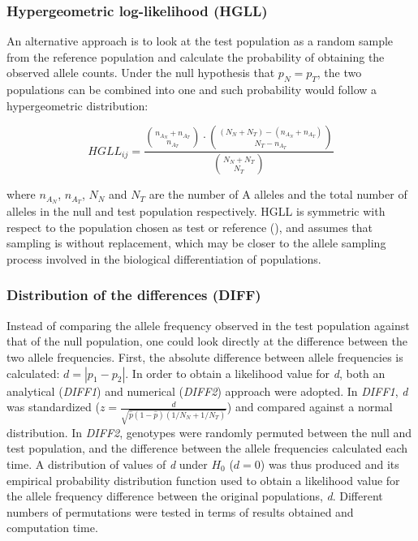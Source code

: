 \documentclass{bmcart}
\begin{document}
\subsubsection*{Hypergeometric log-likelihood (HGLL)}
An alternative approach is to look at the test population as a random
sample from the reference population and calculate the probability of
obtaining the observed allele counts. Under the null hypothesis that $p_N=p_T$, the two populations
can be combined into one and such probability would follow a hypergeometric distribution:

\begin{equation}
HGLL_{ij}=\frac{{n_{A_N}+n_{A_T} \choose n_{A_T}} \cdot {(N_N+N_T)-(n_{A_N}+n_{A_T}) \choose N_T-n_{A_T}}}{{N_N+N_T \choose N_T}}
\end{equation}

where $n_{A_N}$, $n_{A_T}$, $N_N$ and $N_T$ are the number of A alleles
and the total number of
alleles in the null and test population respectively.
HGLL is symmetric with respect to the population chosen as test or
reference (\cite{jantosciak2002duality}), and assumes that sampling is without replacement, which may
be closer to the allele sampling process involved in the biological
differentiation of populations.
 

\subsubsection*{Distribution of the differences (DIFF)}
Instead of comparing the allele frequency observed in the test
population against that of the null population, one could look
directly at the difference between the two allele frequencies. 
First, the absolute difference between allele frequencies is
calculated: $d=|p_1-p_2|$. In order to obtain a likelihood value for
\emph{d}, both an analytical (\emph{DIFF1}) and numerical (\emph{DIFF2})
approach were adopted.
In \emph{DIFF1}, \emph{d} was standardized ($z=\frac{d}{\sqrt{\hat{p}(1-\hat{p})(1/N_N+1/N_T)}}$) and compared against a normal
distribution.
In \emph{DIFF2}, genotypes were randomly permuted between the null and
test population, and the difference between the allele frequencies
calculated each time. A distribution of values of \emph{d} under
\emph{$H_0$} ($d=0$) was thus
produced and its empirical probability distribution function used to obtain a
likelihood value for the allele frequency difference between the
original populations, \emph{d}. Different numbers
of permutations were tested in terms of results obtained and computation
time.
\end{document}
